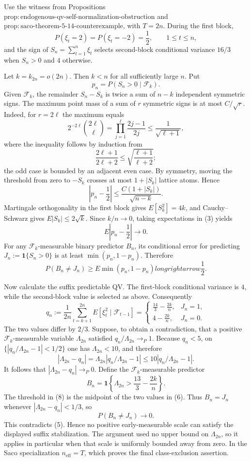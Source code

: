 Use the witness from Propositions~\(\mathrm{prop:endogenous\text{-}qv\text{-}self\text{-}normalization\text{-}obstruction}\) and \(\mathrm{prop:saco\text{-}theorem\text{-}5\text{-}14\text{-}counterexample}\), with \(T=2n\).  During the first block,
\[
P(\xi_t=2)=P(\xi_t=-2)=\frac12,
\qquad 1\le t\le n,
\tag{1}
\]
and the sign of \(S_n=\sum_{t=1}^n\xi_t\) selects second-block conditional variance \(16/3\) when \(S_n>0\) and \(4\) otherwise.

Let \(k=k_{2n}=o(2n)\).  Then \(k<n\) for all sufficiently large \(n\).  Put
\[
p_n=P(S_n>0\mid\mathcal F_k).
\]
Given \(\mathcal F_k\), the remainder \(S_n-S_k\) is twice a sum of \(n-k\) independent symmetric signs.  The maximum point mass of a sum of \(r\) symmetric signs is at most \(C/\sqrt r\).  Indeed, for \(r=2\ell\) the maximum equals
\[
2^{-2\ell}\binom{2\ell}{\ell}
=\prod_{j=1}^{\ell}\frac{2j-1}{2j}
\le\frac1{\sqrt{\ell+1}},
\tag{2}
\]
where the inequality follows by induction from
\[
\frac{2\ell+1}{2\ell+2}\le\sqrt{\frac{\ell+1}{\ell+2}};
\]
the odd case is bounded by an adjacent even case.  By symmetry, moving the threshold from zero to \(-S_k\) crosses at most \(1+|S_k|\) lattice atoms.  Hence
\[
\left|p_n-\frac12\right|
\le\frac{C(1+|S_k|)}{\sqrt{n-k}}.
\tag{3}
\]
Martingale orthogonality in the first block gives \(E[S_k^2]=4k\), and Cauchy--Schwarz gives \(E|S_k|\le2\sqrt k\).  Since \(k/n\to0\), taking expectations in (3) yields
\[
E\left|p_n-\frac12\right|\longrightarrow0.
\tag{4}
\]
For any \(\mathcal F_k\)-measurable binary predictor \(B_n\), its conditional error for predicting \(J_n:=\mathbf1\{S_n>0\}\) is at least \(\min(p_n,1-p_n)\).  Therefore
\[
P(B_n\ne J_n)
\ge E\min(p_n,1-p_n)longrightarrow\frac12.
\tag{5}
\]

Now calculate the suffix predictable QV.  The first-block conditional variance is \(4\), while the second-block value is selected as above.  Consequently
\[
q_n:=\frac1{2n}\sum_{t=k+1}^{2n}E[\xi_t^2\mid\mathcal F_{t-1}]
=
\begin{cases}
\displaystyle\frac{14}{3}-\frac{2k}{n},&J_n=1,\\[4pt]
\displaystyle4-\frac{2k}{n},&J_n=0.
\end{cases}
\tag{6}
\]
The two values differ by \(2/3\).  Suppose, to obtain a contradiction, that a positive \(\mathcal F_k\)-measurable variable \(\Lambda_{2n}\) satisfied \(q_n/\Lambda_{2n}\to_P1\).  Because \(q_n<5\), on \(\{|q_n/\Lambda_{2n}-1|<1/2\}\) one has \(\Lambda_{2n}<10\), and therefore
\[
|\Lambda_{2n}-q_n|
=\Lambda_{2n}|q_n/\Lambda_{2n}-1|
\le10|q_n/\Lambda_{2n}-1|.
\tag{7}
\]
It follows that \(|\Lambda_{2n}-q_n|\to_P0\).  Define the \(\mathcal F_k\)-measurable predictor
\[
B_n=\mathbf1\left\{\Lambda_{2n}>\frac{13}{3}-\frac{2k}{n}\right\}.
\tag{8}
\]
The threshold in (8) is the midpoint of the two values in (6).  Thus \(B_n=J_n\) whenever \(|\Lambda_{2n}-q_n|<1/3\), so
\[
P(B_n\ne J_n)\longrightarrow0.
\tag{9}
\]
This contradicts (5).  Hence no positive early-measurable scale can satisfy the displayed suffix stabilization.  The argument used no upper bound on \(\Lambda_{2n}\), so it applies in particular when that scale is uniformly bounded away from zero.  In the Saco specialization \(n_{\mathrm{eff}}=T\), which proves the final class-exclusion assertion.